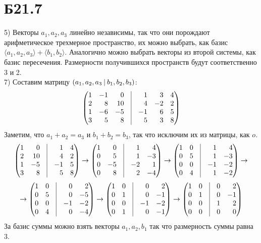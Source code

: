 \documentclass[a4paper,12pt]{article} %
\begin{document}
\section*{Б21.7}
5) Векторы $a_1, a_2,a_3$ линейно независимы, так что они порождают арифметическое трехмерное пространство, их можно выбрать, как базис $\langle a_1, a_2, a_3\rangle + \langle b_1, b_2\rangle$. Аналогично можно выбрать векторы из второй системы, как базис пересечения. Размерности получившихся пространств будут соответственно 3 и 2.\\ 
7) Составим матрицу $\left(a_1,a_2,a_3\ \vline\ b_1,b_2,b_3\right)$:
$$
\begin{pmatrix*}[r]
1&-1&0&\vline&1&3&4\\
2&8&10&\vline&4&-2&2\\
1&-6&-5&\vline&-1&6&5\\
3&5&8&\vline&5&3&8
\end{pmatrix*}$$
Заметим, что $a_1+a_2=a_3$ и $b_1+b_2=b_3$, так что исключим их из матрицы, как $o$.
$$
\begin{pmatrix*}[r]
1&0&\vline&1&4\\
2&10&\vline&4&2\\
1&-5&\vline&-1&5\\
3&8&\vline&5&8
\end{pmatrix*}\rightarrow\begin{pmatrix*}[r]
1&0&\vline&1&4\\
0&5&\vline&1&-3\\
0&-5&\vline&-2&1\\
0&8&\vline&2&-4
\end{pmatrix*}\rightarrow\begin{pmatrix*}[r]
1&0&\vline&1&4\\
0&5&\vline&1&-3\\
0&0&\vline&-1&-2\\
0&4&\vline&1&-2
\end{pmatrix*}\rightarrow
$$
$$
\rightarrow\begin{pmatrix*}[r]
1&0&\vline&0&2\\
0&5&\vline&0&-5\\
0&0&\vline&-1&-2\\
0&4&\vline&0&-4
\end{pmatrix*}\rightarrow
\begin{pmatrix*}[r]
1&0&\vline&0&2\\
0&1&\vline&0&-1\\
0&0&\vline&-1&-2\\
0&1&\vline&0&-1
\end{pmatrix*}\rightarrow\begin{pmatrix*}[r]
1&0&\vline&0&2\\
0&1&\vline&0&-1\\
0&0&\vline&1&2\\
0&0&\vline&0&0
\end{pmatrix*}
$$
За базис суммы можно взять векторы $a_1,a_2,b_1$ так что размерность суммы равна 3.\\
\end{document}
